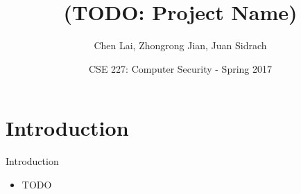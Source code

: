 \documentclass{beamer}
\title{(TODO: Project Name)}
\author{Chen Lai, Zhongrong Jian, Juan Sidrach}
\institute{University of California San Diego}
\date{CSE 227: Computer Security - Spring 2017}
\begin{document}
\begin{frame}
  \titlepage
\end{frame}


\section{Introduction}

\begin{frame}{Introduction}
\begin{itemize}
  \item TODO
\end{itemize}
\end{frame}
\end{document}
